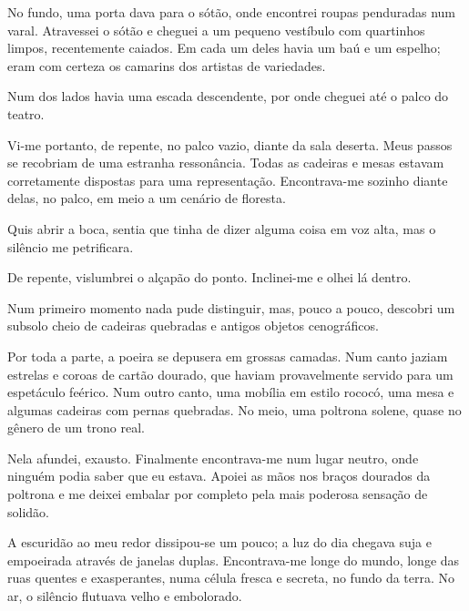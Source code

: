 
No fundo, uma porta dava para o sótão, onde encontrei roupas penduradas num
varal. Atravessei o sótão e cheguei a um pequeno vestíbulo com quartinhos
limpos, recentemente caiados. Em cada um deles havia um baú e um espelho;
eram com certeza os camarins dos artistas de variedades.

Num dos lados havia uma escada descendente, por onde cheguei até o palco do
teatro.

Vi-me portanto, de repente, no palco vazio, diante da sala deserta. Meus
passos se recobriam de uma estranha ressonância. Todas as cadeiras e mesas
estavam corretamente dispostas para uma representação. Encontrava-me sozinho
diante delas, no palco, em meio a um cenário de floresta.

Quis abrir a boca, sentia que tinha de dizer alguma coisa em voz alta, mas o
silêncio me petrificara.

De repente, vislumbrei o alçapão do ponto. Inclinei-me e olhei lá dentro.

Num primeiro momento nada pude distinguir, mas, pouco a pouco, descobri um
subsolo cheio de cadeiras quebradas e antigos objetos cenográficos.


Por toda a parte, a poeira se depusera em grossas camadas. Num canto jaziam
estrelas e coroas de cartão dourado, que haviam provavelmente servido para um
espetáculo feérico. Num outro canto, uma mobília em estilo rococó, uma mesa e
algumas cadeiras com pernas quebradas. No meio, uma poltrona solene, quase no
gênero de um trono real.

Nela afundei, exausto. Finalmente encontrava-me num lugar neutro, onde ninguém
podia saber que eu estava. Apoiei as mãos nos braços dourados da poltrona e
me deixei embalar por completo pela mais poderosa sensação de solidão.

A escuridão ao meu redor dissipou-se um pouco; a luz do dia chegava suja e
empoeirada através de janelas duplas. Encontrava-me longe do mundo, longe das
ruas quentes e exasperantes, numa célula fresca e secreta, no fundo da terra.
No ar, o silêncio flutuava velho e embolorado.

